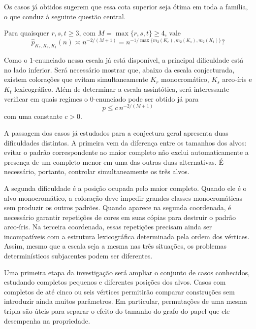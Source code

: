 \documentclass[11pt,a4paper]{article}
\theoremstyle{plain}
\theoremstyle{definition}
\newcounter{question}[section]
\renewcommand{\thequestion}{\thesection.\arabic{question}}
\newenvironment{question}[1][]{%
  \refstepcounter{question}%
  \begin{tcolorbox}[
    enhanced,
    colback=qbluebg,
    colframe=qblue,
    arc=4pt,
    boxrule=1.2pt,
    left=8pt, right=8pt, top=6pt, bottom=6pt,
    fonttitle=\bfseries\sffamily,
    title={\color{white}Pergunta~\thequestion\ifx&#1&\else\ (#1)\fi},
    coltitle=white,
    attach boxed title to top left={yshift=-2mm, xshift=6pt},
    boxed title style={colback=qblue, arc=3pt, boxrule=0pt},
  ]%
  \itshape
}{%
  \end{tcolorbox}%
}
\begin{document}
Os casos já obtidos sugerem que essa cota superior seja ótima em
toda a família, o que conduz à seguinte questão central.

\begin{question}
  \label{q:cliques}
  Para quaisquer $r,s,t\ge3$, com
  $M=\max\{r,s,t\}\ge4$, vale
  \begin{equation}
    \label{eq:conj-cliques}
    \widehat p_{K_r,K_s,K_t}(n)
    \asymp
    n^{-2/(M+1)}
    =
    n^{-1/\max\{m_2(K_r),m_2(K_s),m_2(K_t)\}}?
  \end{equation}
\end{question}

Como o $1$-enunciado nessa escala já está disponível, a principal
dificuldade está no lado inferior. Será necessário mostrar que,
abaixo da escala conjecturada, existem colorações que evitam
simultaneamente $K_r$ monocromático, $K_s$ arco-íris e $K_t$
lexicográfico. Além de determinar a escala assintótica, será
interessante verificar em quais regimes o $0$-enunciado pode ser
obtido já para
\[
  p\le c\,n^{-2/(M+1)}
\]
com uma constante $c>0$.

A passagem dos casos já estudados para a conjectura geral apresenta
duas dificuldades distintas. A primeira vem da diferença entre os
tamanhos dos alvos: evitar o padrão correspondente ao maior completo
não exclui automaticamente a presença de um completo menor em uma
das outras duas alternativas. É necessário, portanto, controlar
simultaneamente os três alvos.

A segunda dificuldade é a posição ocupada pelo maior completo.
Quando ele é o alvo monocromático, a coloração deve impedir grandes
classes monocromáticas sem produzir os outros padrões. Quando aparece
na segunda coordenada, é necessário garantir repetições de cores em
suas cópias para destruir o padrão arco-íris. Na terceira coordenada,
essas repetições precisam ainda ser incompatíveis com a estrutura
lexicográfica determinada pela ordem dos vértices. Assim, mesmo que
a escala seja a mesma nas três situações, os problemas determinísticos
subjacentes podem ser diferentes.

Uma primeira etapa da investigação será ampliar o conjunto de casos
conhecidos, estudando completos pequenos e diferentes posições dos
alvos. Casos com completos de até cinco ou seis vértices permitirão
comparar construções sem introduzir ainda muitos parâmetros. Em
particular, permutações de uma mesma tripla são úteis para separar
o efeito do tamanho do grafo do papel que ele desempenha na
propriedade.
\end{document}
